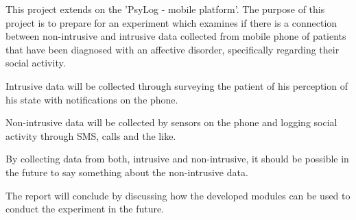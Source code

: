 This project extends on the 'PsyLog - mobile platform'\cite{faelles}.
The purpose of this project is to prepare for an experiment which examines if there is a connection between non-intrusive and intrusive data collected from  mobile phone of patients that have been diagnosed with an affective disorder, specifically regarding their social activity.

Intrusive data will be collected through surveying the patient of his perception of his state with notifications on the phone.

Non-intrusive data will be collected by sensors on the phone and logging social activity through SMS, calls and the like.

By collecting data from both, intrusive and non-intrusive, it should be possible in the future to say something about the non-intrusive data.

The report will conclude by discussing how the developed modules can be used to conduct the experiment in the future.
